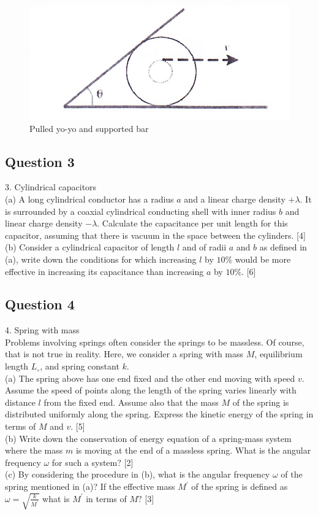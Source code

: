 \documentclass{article}
\begin{document}
\begin{figure}
	\centering
	\includegraphics[width=0.5\linewidth]{spho_book_TYS_images/2014q2.png}
	\caption{Pulled yo-yo and supported bar}
\end{figure}

\subsection{Question 3}
3. Cylindrical capacitors \\
(a) A long cylindrical conductor has a radius $a$ and a linear charge density $+\lambda$. It is surrounded by a coaxial cylindrical conducting shell with inner radius $b$ and linear charge density $-\lambda .$ Calculate the capacitance per unit length for this capacitor, assuming that there is vacuum in the space between the cylinders. [4] \\
(b) Consider a cylindrical capacitor of length $l$ and of radii $a$ and $b$ as defined in (a), write down the conditions for which increasing $l$ by $10 \%$ would be more effective in increasing its capacitance than increasing $a$ by $10 \%$. [6] 

\subsection{Question 4}
4. Spring with mass \\ Problems involving springs often consider the springs to be massless. Of course, that is not true in reality. Here, we consider a spring with mass $M$, equilibrium length $L_{\circ}$, and spring constant $k$. \\
(a) The spring above has one end fixed and the other end moving with speed $v$. Assume the speed of points along the length of the spring varies linearly with distance $l$ from the fixed end. Assume also that the mass $M$ of the spring is distributed uniformly along the spring. Express the kinetic energy of the spring in terms of $M$ and $v$. [5] \\
(b) Write down the conservation of energy equation of a spring-mass system where the mass $m$ is moving at the end of a massless spring. What is the angular frequency $\omega$ for such a system? [2] \\
(c) By considering the procedure in (b), what is the angular frequency $\omega$ of the spring mentioned in (a)? If the effective mass $M^{\prime}$ of the spring is defined as $\omega=\sqrt{\frac{k}{M^{\prime}}}$ what is $M^{\prime}$ in terms of $M ?$ [3]
\end{document}
